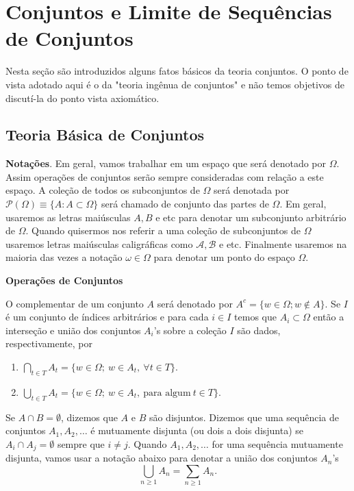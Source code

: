 \chapter[Aula 1]{Conjuntos e Limite de Sequências de Conjuntos}
\chaptermark{}

Nesta seção são introduzidos alguns fatos básicos da teoria
conjuntos. O ponto de vista adotado aqui é o da "teoria ingênua
de conjuntos" e não temos objetivos de discutí-la do ponto 
vista axiomático.

  
\section{Teoria Básica de Conjuntos}
\textbf{Notações}.
%
Em geral, vamos trabalhar em um espaço que será denotado 
por $\Omega$. Assim operações de conjuntos serão sempre 
consideradas com relação a este espaço. 
A coleção de todos os subconjuntos de $\Omega$ será 
denotada por $\mathcal{P}(\Omega)\equiv \{A: A\subset \Omega\}$
será chamado de conjunto das partes de $\Omega$.
Em geral, usaremos as letras maiúsculas $A,B$ e etc para denotar
um subconjunto arbitrário de $\Omega$. Quando quisermos nos referir
a uma coleção de subconjuntos de $\Omega$ usaremos letras maiúsculas 
caligráficas como $\mathcal{A}, \mathcal{B}$ e etc. Finalmente
usaremos na maioria das vezes a notação $\omega\in\Omega$ 
para denotar um ponto do espaço $\Omega$.


\noindent
\textbf{Operações de Conjuntos}

O complementar de um conjunto $A$ será 
denotado por $A^{c}= \{w \in \Omega; w \notin A\}$. 
Se $I$ é um conjunto de índices arbitrários e 
para cada $i\in I$ temos que $A_i\subset \Omega$ então 
a interseção e união dos conjuntos $A_i$'s sobre a coleção
$I$ são dados, respectivamente, por 
\begin{enumerate}
	\item[]  $\displaystyle\bigcap_{t \in T}{A_t}
							= 
						\{ w \in \Omega;\ w \in A_t,\ \forall t \in T\}$.
	\item[]  $\displaystyle\bigcup_{t \in T}{A_t}
							= 
						\{ w \in \Omega;\ w \in A_t,\ \text{para algum}\ t \in T \}$.
\end{enumerate}
%
%
%
Se $A \cap B = \emptyset$, dizemos que $A$ e $B$ são disjuntos.
Dizemos que uma sequência de conjuntos 
$A_1, A_2,\ldots$ é mutuamente disjunta (ou dois a dois disjunta) 
se $A_i \cap A_j = \emptyset$ sempre que $i \neq j$. 
Quando $A_1,A_2,\ldots $ for uma sequência mutuamente disjunta, 
vamos usar a notação abaixo para denotar a união dos conjuntos $A_n$'s
$$
	\displaystyle\bigcup_{n \geqslant 1}{A_n} = \sum_{n \geqslant 1} A_n.	
$$


